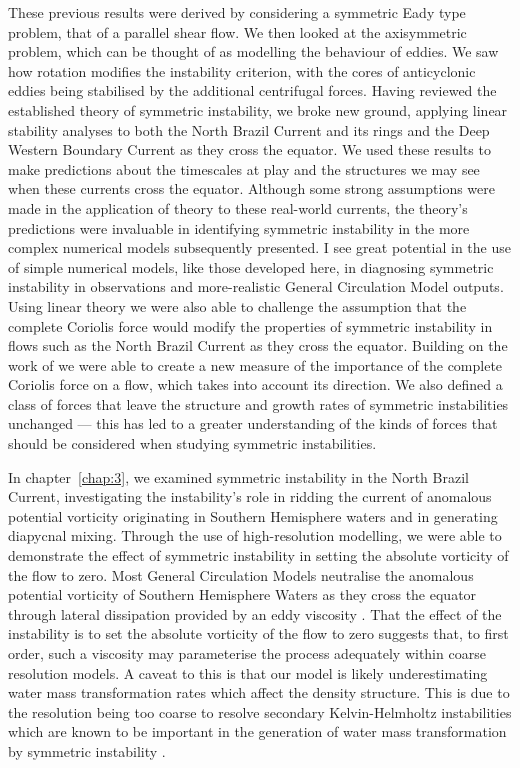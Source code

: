 These previous results were derived by considering a symmetric Eady type problem, that of a parallel shear flow. We then looked at the axisymmetric problem, which can be thought of as modelling the behaviour of eddies. We saw how rotation modifies the instability criterion, with the cores of anticyclonic eddies being stabilised by the additional centrifugal forces. Having reviewed the established theory of symmetric instability, we broke new ground, applying linear stability analyses to both the North Brazil Current and its rings and the Deep Western Boundary Current as they cross the equator. We used these results to make predictions about the timescales at play and the structures we may see when these currents cross the equator. Although some strong assumptions were made in the application of theory to these real-world currents, the theory's predictions were invaluable in identifying symmetric instability in the more complex numerical models subsequently presented. I see great potential in the use of simple numerical models, like those developed here, in diagnosing symmetric instability in observations and more-realistic General Circulation Model outputs. Using linear theory we were also able to challenge the assumption that the complete Coriolis force would modify the properties of symmetric instability in flows such as the North Brazil Current as they cross the equator. Building on the work of \citet{Zeitlin2018a} we were able to create a new measure of the importance of the complete Coriolis force on a flow, which takes into account its direction. We also defined a class of forces that leave the structure and growth rates of symmetric instabilities unchanged --- this has led to a greater understanding of the kinds of forces that should be considered when studying symmetric instabilities.

In chapter~\ref{chap:3}, we examined symmetric instability in the North Brazil Current, investigating the instability's role in ridding the current of anomalous potential vorticity originating in Southern Hemisphere waters and in generating diapycnal mixing. Through the use of high-resolution modelling, we were able to demonstrate the effect of symmetric instability in setting the absolute vorticity of the flow to zero. Most General Circulation Models neutralise the anomalous potential vorticity of Southern Hemisphere Waters as they cross the equator through lateral dissipation provided by an eddy viscosity \citep{Edwards1998I}. That the effect of the instability is to set the absolute vorticity of the flow to zero suggests that, to first order, such a viscosity may parameterise the process adequately within coarse resolution models. A caveat to this is that our model is likely underestimating water mass transformation rates which affect the density structure. This is due to the resolution being too coarse to resolve secondary Kelvin-Helmholtz instabilities which are known to be important in the generation of water mass transformation by symmetric instability \citep[e.g.][]{Yankovsky2019, Griffiths2003a}.

